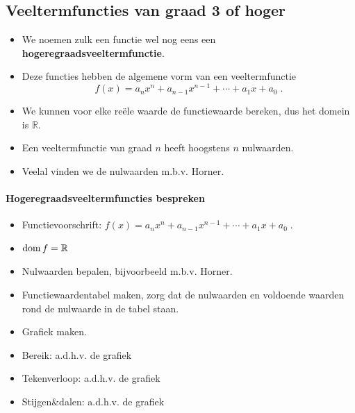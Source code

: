 \documentclass[12pt]{article}
\begin{document}
\begin{theorie}

\pagebreak
\subsection{Veeltermfuncties van graad 3 of hoger}

\begin{itemize}
\item We noemen zulk een functie wel nog eens een {\bf hogeregraadsveeltermfunctie}.
\item Deze functies hebben de algemene vorm van een veeltermfunctie
  $$f(x)= a_nx^n + a_{n-1}x^{n-1} + \cdots + a_1x + a_0\;.$$
\item We kunnen voor elke reële waarde de functiewaarde bereken, dus het domein is $\mathbb{R}$.
\item Een veeltermfunctie van graad $n$ heeft hoogstens $n$ nulwaarden.
\item Veelal vinden we de nulwaarden m.b.v. Horner.
\end{itemize}

\paragraph*{Hogeregraadsveeltermfuncties bespreken}
\begin{mdframed}
  \begin{itemize}
  \item Functievoorschrift: $f(x)= a_nx^n + a_{n-1}x^{n-1} + \cdots + a_1x + a_0\;.$
  \item $\dom f = \mathbb{R}$
  \item Nulwaarden bepalen, bijvoorbeeld m.b.v. Horner.
  \item Functiewaardentabel maken, zorg dat de nulwaarden en voldoende waarden rond de nulwaarde in de tabel staan.
  \item Grafiek maken.
  \item Bereik: a.d.h.v. de grafiek
  \item Tekenverloop: a.d.h.v. de grafiek
  \item Stijgen\&dalen: a.d.h.v. de grafiek
  \end{itemize}
\end{mdframed}

\end{theorie}
\end{document}

